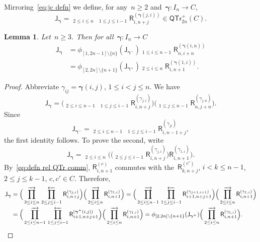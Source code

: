 \documentclass[12pt, reqno]{amsart}
\newcommand{\sfR}{\mathsf{R}}
\newtheorem{lemma}[theorem]{Lemma}
\theoremstyle{definition}
\newcommand{\ascprod}{\mathop{\overrightarrow{\prod}}}
\newcommand{\dscprod}{\mathop{\overleftarrow{\prod}}}
\numberwithin{equation}{section}
\begin{document}
Mirroring~\eqref{eq:jc defn} we define, for any~$n\ge 2$ and~$\boldsymbol\gamma:I_n\to C$,
\begin{equation}\label{eq:Jc defn}
\mathsf J_{\boldsymbol\gamma}=\ascprod_{2\le i\le n}\,\dscprod_{1\le j\le i-1} \sfR_{i,n+j}^{(\boldsymbol\gamma(j,i))}\in\mathsf{QTr}^+_{2n}(C).
\end{equation}
\begin{lemma}\label{lem:Jc rec}
Let~$n\ge 3$. Then
for all~$\boldsymbol\gamma:I_n\to C$
\begin{align}\label{eq:rec Jc}
\mathsf J_{\boldsymbol\gamma}&=\phi_{[1,2n-1]\setminus\{n\}}(\mathsf J_{\boldsymbol\gamma^-})\dscprod_{1\le i\le n-1}
\sfR_{n,i+n}^{(\boldsymbol\gamma(i,n))}\\
&=\phi_{[2,2n]\setminus\{n+1\}}(\mathsf J_{\boldsymbol\gamma^+})\ascprod_{2\le i\le n} \sfR_{i,n+1}^{(\boldsymbol\gamma(1,i))}\label{eq:rec Jc-2}.
\end{align}
\end{lemma}
\begin{proof}
Abbreviate $\gamma_{ij}=\boldsymbol\gamma(i,j)$, $1\le i<j\le n$. 
We have 
$$
\mathsf J_{\boldsymbol\gamma}=\Big(\ascprod_{2\le i\le n-1}\, 
\dscprod_{1\le j\le i-1} \sfR^{(\gamma_{j,i})}_{i,n+j}\Big) \Big(\dscprod_{1\le j\le n-1} \sfR_{n,j+n}^{(\gamma_{j,n})}\Big).
$$
Since
$$
\mathsf J_{\boldsymbol\gamma^-}=\ascprod_{2\le i\le n-1}\,
\dscprod_{1\le j\le i-1} \sfR_{i,n-1+j}^{(\gamma_{ji})},
$$
the first identity follows. To prove the second, write
$$
\mathsf J_{\boldsymbol\gamma}=\ascprod_{2\le i\le n}\Big(
\Big( 
\dscprod_{2\le j\le i-1} \sfR^{(\gamma_{j,i})}_{i,n+j}\Big)\sfR_{i,n+1}^{(\gamma_{1,i})}\Big).
$$
By~\eqref{eq:defn rel QTr comm}, $\sfR_{i,n+1}^{(c)}$ commutes with the~$\sfR_{k,n+j}^{(c')}$, 
$i<k\le n-1$, $2\le j\le k-1$, $c,c'\in C$. Therefore, 
\begin{align*}
\mathsf J_{\boldsymbol\gamma}&=\Big(\ascprod_{3\le i\le n}
\,
\dscprod_{2\le j\le i-1} \sfR^{(\gamma_{j,i})}_{i,n+j}\Big)\Big(\ascprod_{2\le i\le n}\sfR_{i,n+1}^{(\gamma_{1,i})}\Big)=\Big(\ascprod_{2\le i\le n-1}\,
\dscprod_{1\le j\le i-1} \sfR^{(\gamma_{j+1,i+1})}_{i+1,n+j+1}\Big)\Big(\ascprod_{2\le i\le n}\sfR_{i,n+1}^{(\gamma_{1,i})}\Big)\\
&
=\Big(\ascprod_{2\le i\le n-1}
\,
\dscprod_{1\le j\le i-1} \sfR^{(\boldsymbol\gamma^+(i,j))}_{i+1,n+j+1}\Big)\Big(\ascprod_{2\le i\le n}\sfR_{i,n+1}^{(\gamma_{1,i})}\Big)=\phi_{[2,2n]\setminus\{n+1\}}(\mathsf J_{\boldsymbol\gamma^+})\Big(\ascprod_{2\le i\le n}\sfR_{i,n+1}^{(\gamma_{1,i})}\Big).\qedhere
\end{align*}
\end{proof}
\end{document}
